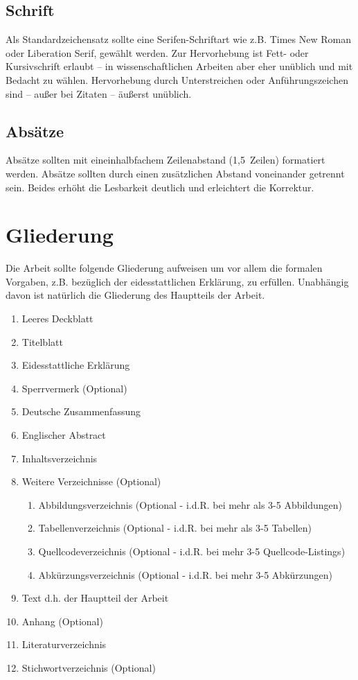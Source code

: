 \subsection{Schrift}\label{sec:structure:layout:fonts}
%
Als Standardzeichensatz sollte eine Serifen-Schriftart wie z.B. Times New Roman oder Liberation Serif, gewählt werden. Zur Hervorhebung ist Fett- oder Kursivschrift erlaubt – in wissenschaftlichen Arbeiten aber eher unüblich und mit Bedacht zu wählen. Hervorhebung durch Unterstreichen oder Anführungszeichen sind -- außer bei Zitaten -- äußerst unüblich.

\subsection{Absätze}\label{sec:structure:layout:paragraphs}
%
Absätze sollten mit eineinhalbfachem Zeilenabstand (1,5~Zeilen) formatiert werden. Absätze sollten durch einen zusätzlichen Abstand voneinander getrennt sein. Beides erhöht die Lesbarkeit deutlich und erleichtert die Korrektur.

\section{Gliederung}\label{sec:structure:structure}
%
Die Arbeit sollte folgende Gliederung aufweisen um vor allem die formalen Vorgaben, z.B. bezüglich der eidesstattlichen Erklärung, zu erfüllen. Unabhängig davon ist natürlich die Gliederung des Hauptteils der Arbeit.

\begin{enumerate}
  \item Leeres Deckblatt
  \item Titelblatt
  \item Eidesstattliche Erklärung
  \item Sperrvermerk (Optional)
  \item Deutsche Zusammenfassung
  \item Englischer Abstract
  \item Inhaltsverzeichnis
  \item Weitere Verzeichnisse (Optional)
  \begin{enumerate}
    \item Abbildungsverzeichnis (Optional - i.d.R. bei mehr als 3-5 Abbildungen) 
    \item Tabellenverzeichnis (Optional - i.d.R. bei mehr als 3-5 Tabellen)
    \item Quellcodeverzeichnis (Optional - i.d.R. bei mehr 3-5 Quellcode-Listings)
    \item Abkürzungsverzeichnis (Optional - i.d.R. bei mehr 3-5 Abkürzungen)
  \end{enumerate}
  \item Text d.h. der Hauptteil der Arbeit
  \item Anhang (Optional)
  \item Literaturverzeichnis 
  \item Stichwortverzeichnis (Optional)
\end{enumerate}
\smallskip

